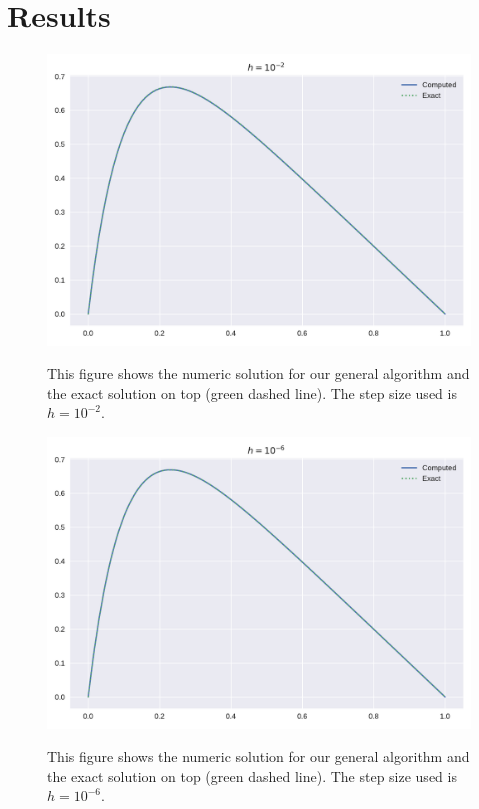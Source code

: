\documentclass[reprint, english,notitlepage]{revtex4-1}  %
\begin{document}
\section{Results}

\begin{figure}[h]
	\centering
	\includegraphics[scale=0.44]{../output/slow_2.pdf}
	\label{fig:slow_2}
	\caption{This figure shows the numeric solution for our general algorithm and the exact solution on top (green dashed line). The step size used is $h=10^{-2}$.} 
\end{figure}

\begin{figure}[h]
	\centering
	\includegraphics[scale=0.44]{../output/slow_6.pdf}
	\label{fig:slow_6}
	\caption{This figure shows the numeric solution for our general algorithm and the exact solution on top (green dashed line). The step size used is $h=10^{-6}$.} 
\end{figure}
\end{document}
